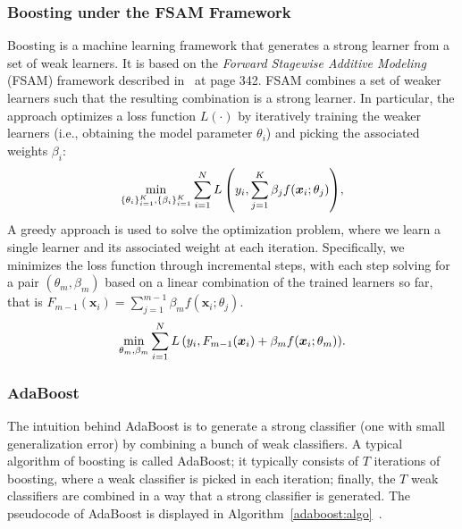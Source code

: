     \subsubsection{Boosting under the FSAM Framework}\label{sec:boosting-trees}
    Boosting is a machine learning framework that generates a strong learner  from a set of weak learners. 
    It is based on the \textit{Forward Stagewise Additive Modeling} (FSAM) framework described in~\cite{hastie2009elements} at page 342. 
    FSAM combines a set of weaker learners such that the resulting combination is a strong learner. 
    In particular, the approach optimizes a loss function $L(\cdot)$  by iteratively training the weaker learners (i.e., obtaining the model parameter $\theta_i$) and picking the associated weights $\beta_i$:
            \begin{equation}
                \min_{\{ \theta_i \}_{i=1}^{K}, \{ \beta_i \}_{i=1}^{K} } \sum_{i=1}^{N}{L\left( y_i, \sum_{j=1}^{K}{\beta_j f(\bm{x}_i; \theta_j)} \right)},
            \end{equation}
        A greedy approach is used to solve the optimization problem, where we learn a single learner and its associated weight  at each iteration. 
        Specifically, we minimizes the loss function through  incremental steps,  with each step solving for a pair $(\theta_m, \beta_m)$ based on a linear combination of the trained learners so far, that is $F_{m-1}(\bm{x}_i) = \sum_{j=1}^{m-1}{\beta_m f(\bm{x}_i; \theta_j)}$.
            \begin{equation}\label{eq:forward-stagewise-add-model}
                \min_{\theta_m, \beta_m} \sum_{i=1}^{N}{
                    L\left( y_i, F_{m-1}(\bm{x}_i) + \beta_m f(\bm{x}_i; \theta_m) \right)
                }.
            \end{equation}
    
        
        

        
\subsubsection{AdaBoost}
The intuition behind AdaBoost is to generate a strong classifier (one with small generalization error) by combining a bunch of weak classifiers. 
A typical algorithm of boosting is called AdaBoost; it typically consists of $T$ iterations of boosting, where a weak classifier is picked in each iteration; finally, the $T$ weak classifiers are combined in a way that a strong classifier is generated. 
The pseudocode of AdaBoost is displayed in Algorithm~\ref{adaboost:algo}~\cite{mohri2018foundations}.

